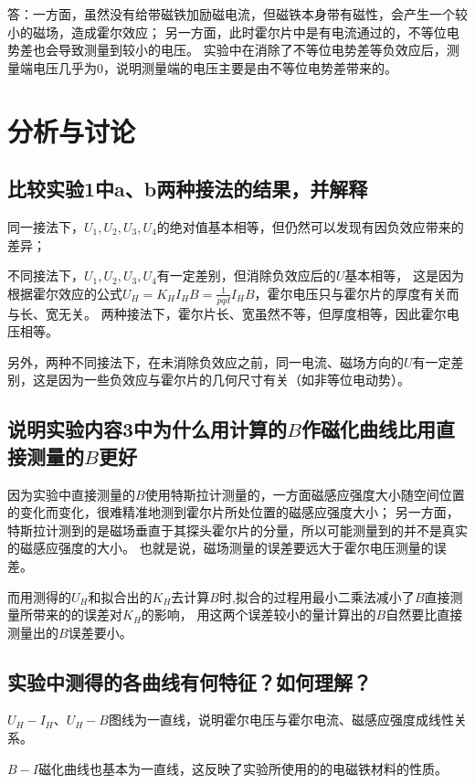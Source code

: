 \documentclass{article}
\begin{document}
    答：一方面，虽然没有给带磁铁加励磁电流，但磁铁本身带有磁性，会产生一个较小的磁场，造成霍尔效应；
    另一方面，此时霍尔片中是有电流通过的，不等位电势差也会导致测量到较小的电压。
    实验中在消除了不等位电势差等负效应后，测量端电压几乎为0，说明测量端的电压主要是由不等位电势差带来的。

    \section{分析与讨论}
    
    \subsection{比较实验1中a、b两种接法的结果，并解释}
    同一接法下，$U_1,U_2,U_3,U_4$的绝对值基本相等，但仍然可以发现有因负效应带来的差异；
    
    不同接法下，$U_1,U_2,U_3,U_4$有一定差别，但消除负效应后的$U$基本相等，
    这是因为根据霍尔效应的公式$U_H=K_H I_H B=\frac{1}{pqd}I_H B$，霍尔电压只与霍尔片的厚度有关而与长、宽无关。
    两种接法下，霍尔片长、宽虽然不等，但厚度相等，因此霍尔电压相等。

    另外，两种不同接法下，在未消除负效应之前，同一电流、磁场方向的$U$有一定差别，这是因为一些负效应与霍尔片的几何尺寸有关（如非等位电动势）。

    \subsection{说明实验内容3中为什么用计算的$B$作磁化曲线比用直接测量的$B$更好}
    因为实验中直接测量的$B$使用特斯拉计测量的，一方面磁感应强度大小随空间位置的变化而变化，很难精准地测到霍尔片所处位置的磁感应强度大小；
    另一方面，特斯拉计测到的是磁场垂直于其探头霍尔片的分量，所以可能测量到的并不是真实的磁感应强度的大小。
    也就是说，磁场测量的误差要远大于霍尔电压测量的误差。
    
    而用测得的$U_H$和拟合出的$K_H$去计算$B$时,拟合的过程用最小二乘法减小了$B$直接测量所带来的的误差对$K_H$的影响，
    用这两个误差较小的量计算出的$B$自然要比直接测量出的$B$误差要小。

    \subsection{实验中测得的各曲线有何特征？如何理解？}
    $U_H-I_H$、$U_H-B$图线为一直线，说明霍尔电压与霍尔电流、磁感应强度成线性关系。
    
    $B-I$磁化曲线也基本为一直线，这反映了实验所使用的的电磁铁材料的性质。
    
\end{document}
